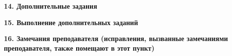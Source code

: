 \documentclass[12pt,fleqn]{article}
\begin{document}
\begin{justify}
    \textbf{14. Дополнительные задания}
\end{justify}

\begin{justify}
    \textbf{15. Выполнение дополнительных заданий}
\end{justify}

\begin{justify}
    \textbf{16. Замечания преподавателя (исправления, вызванные замечаниями преподавателя, также помещают в этот пункт)}
\end{justify}
\end{document}
